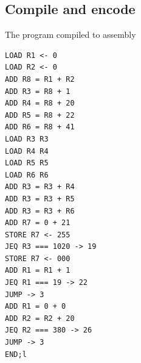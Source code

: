 \documentclass[a4paper, english]{article}
\numberwithin{equation}{section}
\begin{document}
\subsection{Compile and encode}
\begin{listing}
    \centering
    \caption[short]{The program compiled to assembly}\label{lst:ass}
    \begin{verbatim}
LOAD R1 <- 0
LOAD R2 <- 0
ADD R8 = R1 + R2
ADD R3 = R8 + 1
ADD R4 = R8 + 20
ADD R5 = R8 + 22
ADD R6 = R8 + 41
LOAD R3 R3
LOAD R4 R4
LOAD R5 R5
LOAD R6 R6
ADD R3 = R3 + R4
ADD R3 = R3 + R5
ADD R3 = R3 + R6
ADD R7 = 0 + 21
STORE R7 <- 255
JEQ R3 === 1020 -> 19
STORE R7 <- 000
ADD R1 = R1 + 1
JEQ R1 === 19 -> 22
JUMP -> 3
ADD R1 = 0 + 0
ADD R2 = R2 + 20
JEQ R2 === 380 -> 26
JUMP -> 3
END;l
    \end{verbatim}
\end{listing}
\end{document}
